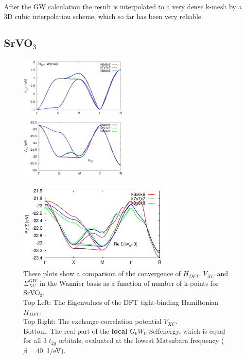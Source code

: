 \documentclass[12pt,a4paper]{scrartcl}
\numberwithin{equation}{section}
\begin{document}
After the GW calculation the result is interpolated to a very dense k-mesh
by a 3D cubic interpolation scheme, which so far has been very reliable.

\clearpage

\subsection{SrVO$_3$}

\begin{figure}[h]
\includegraphics[width=0.5\textwidth]{figs/kmesh/hdft_kpath.pdf}
\includegraphics[width=0.5\textwidth]{figs/kmesh/vxc_kpath.pdf}
\begin{center}
\includegraphics[width=0.7\textwidth]{figs/kmesh/ReSigma_kpath.pdf}
\end{center}
\caption{
These plots show a comparison of the convergence of $H_{DFT}$, $V_{XC}$ and
$\Sigma^{GW}_{XC}$ in the Wannier basis as a function of number of k-points for SrVO$_3$.\\
Top Left: The Eigenvalues of the DFT tight-binding Hamiltonian $H_{DFT}$.\\
Top Right: The exchange-correlation potential $V_{XC}$. \\
Bottom: The real part of the \textbf{local} $G_0W_0$ Selfenergy, which is equal for 
all 3 $t_{2g}$ orbitals, evaluated at the lowest Matsubara frequency ($\beta=40$\ 1/eV). }
\label{fig:gw_kpath_kmesh_comp}
\end{figure}
\end{document}
